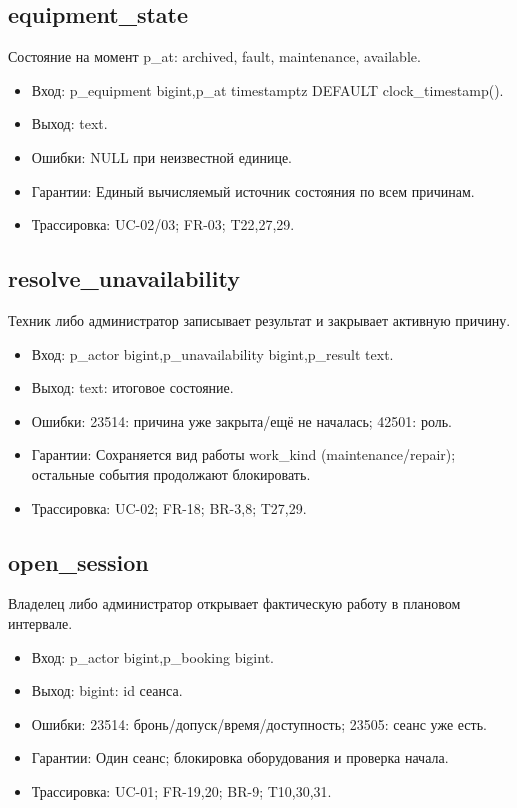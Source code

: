 \subsection{equipment\_\allowbreak{}state}
Состояние на момент p\_\allowbreak{}at: archived, fault, maintenance, available.
\begin{itemize}
\item Вход: p\_\allowbreak{}equipment bigint,p\_\allowbreak{}at timestamptz DEFAULT clock\_\allowbreak{}timestamp().
\item Выход: text.
\item Ошибки: NULL при неизвестной единице.
\item Гарантии: Единый вычисляемый источник состояния по всем причинам.
\item Трассировка: UC-02/\allowbreak{}03; FR-03; T22,27,29.
\end{itemize}
\subsection{resolve\_\allowbreak{}unavailability}
Техник либо администратор записывает результат и закрывает активную причину.
\begin{itemize}
\item Вход: p\_\allowbreak{}actor bigint,p\_\allowbreak{}unavailability bigint,p\_\allowbreak{}result text.
\item Выход: text: итоговое состояние.
\item Ошибки: 23514: причина уже закрыта/\allowbreak{}ещё не началась; 42501: роль.
\item Гарантии: Сохраняется вид работы work\_\allowbreak{}kind (maintenance/\allowbreak{}repair); остальные события продолжают блокировать.
\item Трассировка: UC-02; FR-18; BR-3,8; T27,29.
\end{itemize}
\subsection{open\_\allowbreak{}session}
Владелец либо администратор открывает фактическую работу в плановом интервале.
\begin{itemize}
\item Вход: p\_\allowbreak{}actor bigint,p\_\allowbreak{}booking bigint.
\item Выход: bigint: id сеанса.
\item Ошибки: 23514: бронь/\allowbreak{}допуск/\allowbreak{}время/\allowbreak{}доступность; 23505: сеанс уже есть.
\item Гарантии: Один сеанс; блокировка оборудования и проверка начала.
\item Трассировка: UC-01; FR-19,20; BR-9; T10,30,31.
\end{itemize}
